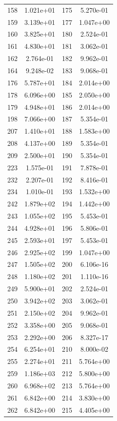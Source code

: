 \documentclass[12pt]{article}
\begin{document}
\begin{longtable}{@{}cccc@{}}
158 & 1.021e+01 & 175 & 5.270e-01 \\
159 & 3.139e+01 & 177 & 1.047e+00 \\
160 & 3.825e+01 & 180 & 2.524e-01 \\
161 & 4.830e+01 & 181 & 3.062e-01 \\
162 & 2.764e-01 & 182 & 9.962e-01 \\
164 & 9.248e-02 & 183 & 9.068e-01 \\
176 & 5.787e+01 & 184 & 2.014e+00 \\
178 & 6.096e+00 & 185 & 2.050e+00 \\
179 & 4.948e+01 & 186 & 2.014e+00 \\
198 & 7.066e+00 & 187 & 5.354e-01 \\
207 & 1.410e+01 & 188 & 1.583e+00 \\
208 & 4.137e+00 & 189 & 5.354e-01 \\
209 & 2.500e+01 & 190 & 5.354e-01 \\
223 & 1.575e-01 & 191 & 7.878e-01 \\
232 & 2.207e-01 & 192 & 8.416e-01 \\
234 & 1.010e-01 & 193 & 1.532e+00 \\
242 & 1.879e+02 & 194 & 1.442e+00 \\
243 & 1.055e+02 & 195 & 5.453e-01 \\
244 & 4.928e+01 & 196 & 5.806e-01 \\
245 & 2.593e+01 & 197 & 5.453e-01 \\
246 & 2.925e+02 & 199 & 1.047e+00 \\
247 & 1.505e+02 & 200 & 6.106e-16 \\
248 & 1.180e+02 & 201 & 1.110e-16 \\
249 & 5.900e+01 & 202 & 2.524e-01 \\
250 & 3.942e+02 & 203 & 3.062e-01 \\
251 & 2.150e+02 & 204 & 9.962e-01 \\
252 & 3.358e+00 & 205 & 9.068e-01 \\
253 & 2.292e+00 & 206 & 8.327e-17 \\
254 & 6.254e+01 & 210 & 8.000e-02 \\
255 & 2.274e+01 & 211 & 5.764e+00 \\
259 & 1.186e+03 & 212 & 5.800e+00 \\
260 & 6.968e+02 & 213 & 5.764e+00 \\
261 & 6.842e+00 & 214 & 3.830e+00 \\
262 & 6.842e+00 & 215 & 4.405e+00 \\

\end{longtable}
\end{document}
